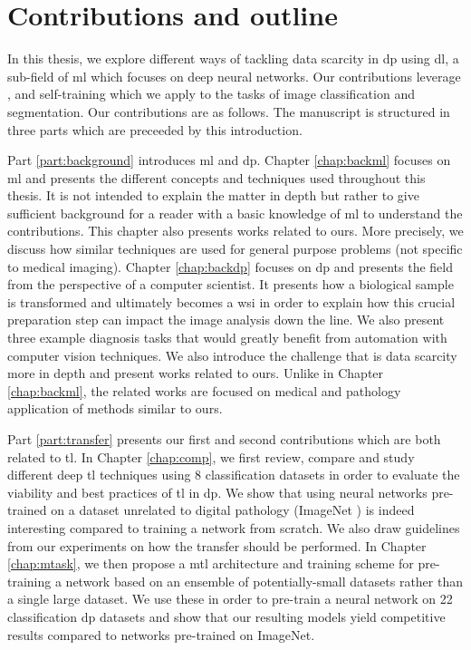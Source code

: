 \section{Contributions and outline}

In this thesis, we explore different ways of tackling data scarcity in \acrlong{dp} using \acrlong{dl}, a sub-field of \acrlong{ml} which focuses on deep neural networks. Our contributions leverage ,  and self-training which we apply to the tasks of image classification and segmentation. Our contributions are as follows. The manuscript is structured in three parts which are preceeded by this introduction.

Part \ref{part:background} introduces \acrlong{ml} and \acrlong{dp}. Chapter \ref{chap:backml} focuses on \acrlong{ml} and presents the different concepts and techniques used throughout this thesis. It is not intended to explain the matter in depth but rather to give sufficient background for a reader with a basic knowledge of \acrlong{ml} to understand the contributions. This chapter also presents works related to ours. More precisely, we discuss how similar techniques are used for general purpose problems (\ie not specific to medical imaging). Chapter \ref{chap:backdp} focuses on \acrlong{dp} and presents the field from the perspective of a computer scientist. It presents how a biological sample is transformed and ultimately becomes a \acrlong{wsi} in order to explain how this crucial preparation step can impact the image analysis down the line. We also present three example diagnosis tasks that would greatly benefit from automation with computer vision techniques. We also introduce the challenge that is data scarcity more in depth and present works related to ours. Unlike in Chapter \ref{chap:backml}, the related works are focused on medical and pathology application of methods similar to ours.

Part \ref{part:transfer} presents our first and second contributions which are both related to \acrlong{tl}. In Chapter \ref{chap:comp}, we first review, compare and study different deep \acrlong{tl} techniques using 8 classification datasets in order to evaluate the viability and best practices of \acrlong{tl} in \acrlong{dp}. We show that using neural networks pre-trained on a dataset unrelated to digital pathology (\ie ImageNet \parencite{deng2009imagenet}) is indeed interesting compared to training a network from scratch. We also draw guidelines from our experiments on how the transfer should be performed. In Chapter \ref{chap:mtask}, we then propose a \acrlong{mtl} architecture and training scheme for pre-training a network based on an ensemble of potentially-small datasets rather than a single large dataset. We use these in order to pre-train a neural network on 22 classification \acrlong{dp} datasets and show that our resulting models yield competitive results compared to networks pre-trained on ImageNet. 

